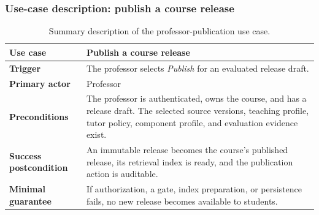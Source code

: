 
\subsubsection{Use-case description: publish a course release}
\label{uc:publish-release}

\begin{table}[htbp]
  \centering
  \small
  \begin{tabularx}{\textwidth}{>{\bfseries}p{}X}
    \toprule
    Use case & Publish a course release \\
    \midrule
    Trigger & The professor selects \emph{Publish} for an evaluated release draft. \\
    Primary actor & Professor \\
    Preconditions & The professor is authenticated, owns the course, and has a release draft. The selected source versions, teaching profile, tutor policy, component profile, and evaluation evidence exist. \\
    Success postcondition & An immutable release becomes the course's published release, its retrieval index is ready, and the publication action is auditable. \\
    Minimal guarantee & If authorization, a gate, index preparation, or persistence fails, no new release becomes available to students. \\
    \bottomrule
  \end{tabularx}
  \caption{Summary description of the professor-publication use case.}
  \label{tab:publication-use-case-summary}
\end{table}

